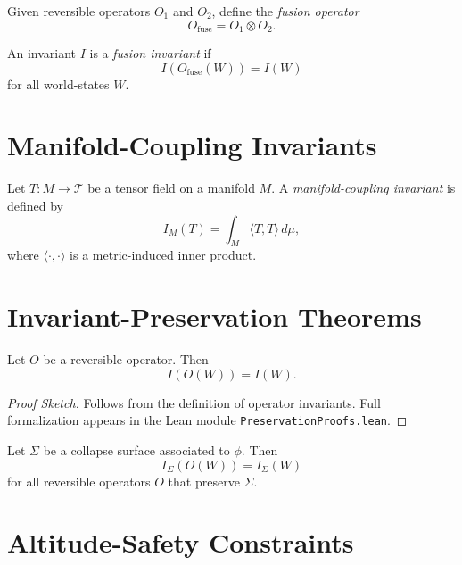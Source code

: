 \documentclass[12pt]{article}
\begin{document}
\begin{definition}
Given reversible operators $O_1$ and $O_2$, define the \emph{fusion operator}
\[
O_{\mathrm{fuse}} = O_1 \otimes O_2.
\]
\end{definition}

\begin{definition}
An invariant $I$ is a \emph{fusion invariant} if
\[
I(O_{\mathrm{fuse}}(W)) = I(W)
\]
for all world-states $W$.
\end{definition}

\section{Manifold-Coupling Invariants}

\begin{definition}
Let $T : M \to \mathcal{T}$ be a tensor field on a manifold $M$. A
\emph{manifold-coupling invariant} is defined by
\[
I_M(T) = \int_M \langle T, T \rangle \, d\mu,
\]
where $\langle \cdot, \cdot \rangle$ is a metric-induced inner product.
\end{definition}

\section{Invariant-Preservation Theorems}

\begin{theorem}
Let $O$ be a reversible operator. Then
\[
I(O(W)) = I(W).
\]
\end{theorem}

\begin{proof}[Proof Sketch]
Follows from the definition of operator invariants. Full formalization appears
in the Lean module \texttt{PreservationProofs.lean}.
\end{proof}

\begin{theorem}
Let $\Sigma$ be a collapse surface associated to $\phi$. Then
\[
I_\Sigma(O(W)) = I_\Sigma(W)
\]
for all reversible operators $O$ that preserve $\Sigma$.
\end{theorem}

\section{Altitude-Safety Constraints}
\end{document}
